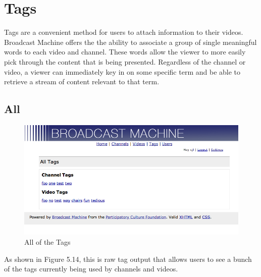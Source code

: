 \documentclass[a4paper,12pt]{report}
\begin{document}
\section{Tags}
Tags are a convenient method for users to attach information to their videos.
Broadcast Machine offers the the ability to associate a group of single meaningful words to each video and channel.
These words allow the viewer to more easily pick through the content that is being presented.
Regardless of the channel or video, a viewer can immediately key in on some specific term and be able to retrieve a stream of content relevant to that term.

\subsection{All}
\begin{figure}[htp]
\begin{center}
\includegraphics[width=150mm]{./images/tagall.png}
\end{center}
\caption{All of the Tags}
\end{figure}

As shown in Figure 5.14, this is raw tag output that allows users to see a bunch of the tags currently being used by channels and videos.
\end{document}
